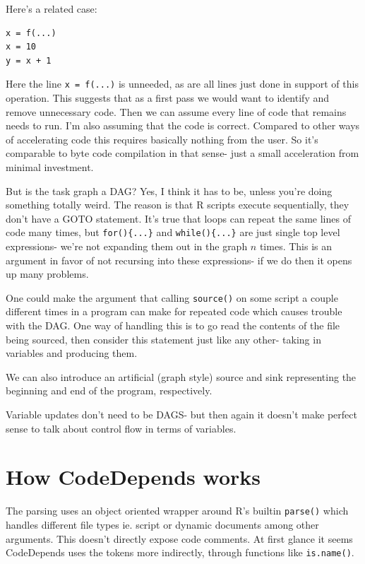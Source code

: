 \documentclass[12pt]{article}
\begin{document}
Here's a related case:

\begin{verbatim}
x = f(...)
x = 10
y = x + 1
\end{verbatim}

Here the line \texttt{x = f(...)} is unneeded, as are all lines just done
in support of this operation. This suggests that as a first pass we would
want to identify and remove unnecessary code. Then we can assume every
line of code that remains needs to run. I'm also assuming that the code is
correct. Compared to other ways of accelerating code this requires
basically nothing from the user. So it's comparable to byte code
compilation in that
sense- just a small acceleration from minimal investment.

But is the task graph a DAG? Yes, I think it has to be, unless you're doing
something totally weird.  The reason is that R scripts execute
sequentially, they don't have a GOTO statement. It's true that loops can
repeat the same lines of code many times, but \texttt{for()\{...\}} and 
\texttt{while()\{...\}} are just single top level expressions- we're not
expanding them out in the graph $n$ times. This is an argument in favor of
not recursing into these expressions- if we do then it opens up many
problems. 

One could make the argument that calling \texttt{source()} on some script
a couple different times in a program can make for repeated code which
causes trouble with the DAG. One way of handling this is to go read the
contents of the file being sourced, then consider this statement just like
any other- taking in variables and producing them.

We can also introduce an artificial (graph style) source and sink representing the
beginning and end of the program, respectively.

Variable updates don't need to be DAGS- but then again it doesn't make
perfect sense to talk about control flow in terms of variables.

\section{How CodeDepends works}

The parsing uses an object oriented wrapper around R's builtin \texttt{parse()}
which handles different file types ie. script or dynamic documents among other arguments.
This doesn't directly expose code comments.
At first glance it seems CodeDepends uses the tokens
more indirectly, through functions like \texttt{is.name()}. 
\end{document}
